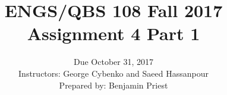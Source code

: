 \documentclass[12pt]{article}
\begin{document}
 


\title{ENGS/QBS 108 Fall 2017 Assignment 4 Part 1}
\author{Due October 31, 2017 \\ Instructors: George Cybenko and Saeed Hassanpour \\ Prepared by: Benjamin Priest}
\date{}
\maketitle

\pagebreak

\end{document}
